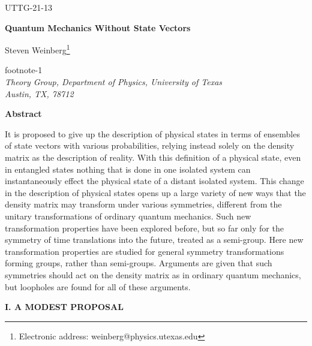 \documentclass[12pt]{article}
\def\fnote#1#2{\begingroup\def\thefootnote{#1}\footnote{#2}\addtocounter
{footnote}{-1}\endgroup}
\begin{document}
\hfill{UTTG-21-13 }


\vspace{36pt}


\begin{center}
{\large {\bf {Quantum Mechanics Without State Vectors}}}


\vspace{36pt}
Steven Weinberg\fnote{*}{Electronic address:
weinberg@physics.utexas.edu}\\
{\em Theory Group, Department of Physics, University of
Texas\\
Austin, TX, 78712}


\vspace{30pt}

\noindent
{\bf Abstract}
\end{center}

It is proposed to give up the description of physical states in terms of ensembles of state vectors with various probabilities, relying instead solely on the density matrix as the description of reality.  With this definition of a physical state,  even in entangled states nothing that is done in one isolated system can instantaneously effect the physical state of a distant isolated system.  This change in the description of physical states opens up a large variety of new ways that the density matrix may transform under various symmetries, different from the unitary transformations of ordinary quantum mechanics.  Such new transformation properties have been explored before, but so far only for the symmetry of time translations into the future, treated as a semi-group.  Here new transformation properties are  studied for general symmetry transformations forming groups, rather than semi-groups.  Arguments are given that such symmetries should act on the density matrix as in ordinary quantum mechanics, but loopholes are found for all of these arguments.
\noindent


\vfill

\pagebreak

\begin{center}
{\bf I. A MODEST PROPOSAL}
\end{center}
\end{document}
